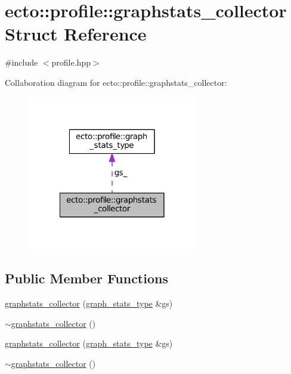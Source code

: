 \hypertarget{structecto_1_1profile_1_1graphstats__collector}{\section{ecto\-:\-:profile\-:\-:graphstats\-\_\-collector Struct Reference}
\label{structecto_1_1profile_1_1graphstats__collector}
}


{\ttfamily \#include $<$profile.\-hpp$>$}



Collaboration diagram for ecto\-:\-:profile\-:\-:graphstats\-\_\-collector\-:\nopagebreak
\begin{figure}[H]
\begin{center}
\leavevmode
\includegraphics[width=210pt]{structecto_1_1profile_1_1graphstats__collector__coll__graph}
\end{center}
\end{figure}
\subsection*{Public Member Functions}
\begin{DoxyCompactItemize}
\item 
\hyperlink{structecto_1_1profile_1_1graphstats__collector_a375c75ce1c0197d1d87a5fc1bdf97050}{graphstats\-\_\-collector} (\hyperlink{structecto_1_1profile_1_1graph__stats__type}{graph\-\_\-stats\-\_\-type} \&gs)
\item 
\hyperlink{structecto_1_1profile_1_1graphstats__collector_a1bc967dcde1e3418aeeb10e58a52d79f}{$\sim$graphstats\-\_\-collector} ()
\item 
\hyperlink{structecto_1_1profile_1_1graphstats__collector_a375c75ce1c0197d1d87a5fc1bdf97050}{graphstats\-\_\-collector} (\hyperlink{structecto_1_1profile_1_1graph__stats__type}{graph\-\_\-stats\-\_\-type} \&gs)
\item 
\hyperlink{structecto_1_1profile_1_1graphstats__collector_a1bc967dcde1e3418aeeb10e58a52d79f}{$\sim$graphstats\-\_\-collector} ()
\end{DoxyCompactItemize}
